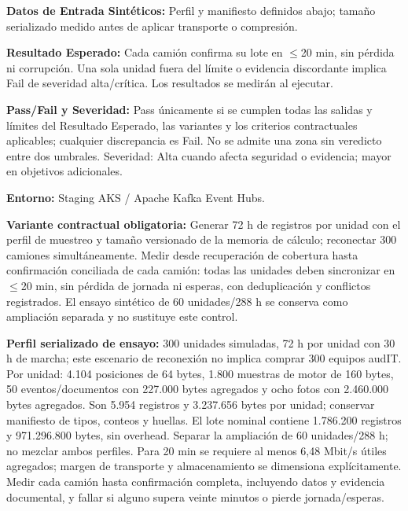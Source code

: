 \par\noindent\textbf{Datos de Entrada Sintéticos:} Perfil y manifiesto definidos abajo; tamaño serializado medido antes de aplicar transporte o compresión.\par
\par\noindent\textbf{Resultado Esperado:} Cada camión confirma su lote en \(\le\)20 min, sin pérdida ni corrupción. Una sola unidad fuera del límite o evidencia discordante implica Fail de severidad alta/crítica. Los resultados se medirán al ejecutar.\par
\par\noindent\textbf{Pass/Fail y Severidad:} Pass únicamente si se cumplen todas las salidas y límites del Resultado Esperado, las variantes y los criterios contractuales aplicables; cualquier discrepancia es Fail. No se admite una zona sin veredicto entre dos umbrales. Severidad: Alta cuando afecta seguridad o evidencia; mayor en objetivos adicionales.\par
\par\noindent\textbf{Entorno:} Staging AKS / Apache Kafka Event Hubs.\par

\par\noindent\textbf{Variante contractual obligatoria:} Generar 72 h de registros por unidad con el perfil de muestreo y tamaño versionado de la memoria de cálculo; reconectar 300 camiones simultáneamente. Medir desde recuperación de cobertura hasta confirmación conciliada de cada camión: todas las unidades deben sincronizar en \(\le\)20 min, sin pérdida de jornada ni esperas, con deduplicación y conflictos registrados. El ensayo sintético de 60 unidades/288 h se conserva como ampliación separada y no sustituye este control.\par

\par\noindent\textbf{Perfil serializado de ensayo:} 300 unidades simuladas, 72 h por unidad con 30 h de marcha; este escenario de reconexión no implica comprar 300 equipos audIT. Por unidad: 4.104 posiciones de 64 bytes, 1.800 muestras de motor de 160 bytes, 50 eventos/documentos con 227.000 bytes agregados y ocho fotos con 2.460.000 bytes agregados. Son 5.954 registros y 3.237.656 bytes por unidad; conservar manifiesto de tipos, conteos y huellas. El lote nominal contiene 1.786.200 registros y 971.296.800 bytes, sin overhead. Separar la ampliación de 60 unidades/288 h; no mezclar ambos perfiles. Para 20 min se requiere al menos 6,48 Mbit/s útiles agregados; margen de transporte y almacenamiento se dimensiona explícitamente. Medir cada camión hasta confirmación completa, incluyendo datos y evidencia documental, y fallar si alguno supera veinte minutos o pierde jornada/esperas.\par

